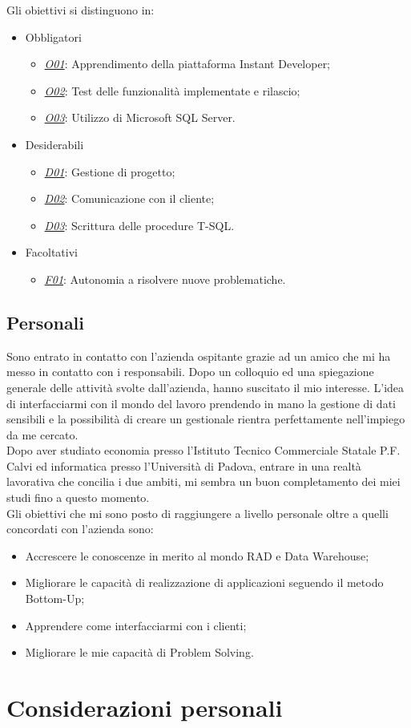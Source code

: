 Gli obiettivi si distinguono in:
\begin{itemize}
	\item Obbligatori
	\begin{itemize}
		\item \underline{\textit{O01}}: Apprendimento della piattaforma Instant Developer;
		\item \underline{\textit{O02}}: Test delle funzionalità implementate e rilascio;
		\item \underline{\textit{O03}}: Utilizzo di Microsoft SQL Server.
	\end{itemize}
	
	\item Desiderabili 
	\begin{itemize}
		\item \underline{\textit{D01}}: Gestione di progetto;
		\item \underline{\textit{D02}}: Comunicazione con il cliente;
		\item \underline{\textit{D03}}: Scrittura delle procedure T-SQL.
	\end{itemize}
	
	\item Facoltativi
	\begin{itemize}
		\item \underline{\textit{F01}}: Autonomia a risolvere nuove problematiche.
	\end{itemize} 
\end{itemize}

\subsection{Personali}
Sono entrato in contatto con l’azienda ospitante grazie ad un amico che mi ha messo in contatto con i responsabili. Dopo un colloquio ed una spiegazione generale delle attività svolte dall'azienda, hanno suscitato il mio interesse. L'idea di interfacciarmi con il mondo del lavoro prendendo in mano la gestione di dati sensibili e la possibilità di creare un gestionale rientra perfettamente nell'impiego da me cercato.\\
Dopo aver studiato economia presso l'Istituto Tecnico Commerciale Statale P.F. Calvi ed informatica presso l'Università di Padova, entrare in una realtà lavorativa che concilia i due ambiti, mi sembra un buon completamento dei miei studi fino a questo momento.\\
Gli obiettivi che mi sono posto di raggiungere a livello personale oltre a quelli concordati con l'azienda sono: 
\begin{itemize}
	\item Accrescere le conoscenze in merito al mondo RAD e Data Warehouse;
	\item Migliorare le capacità di realizzazione di applicazioni seguendo il metodo Bottom-Up;
	\item Apprendere come interfacciarmi con i clienti;
	\item Migliorare le mie capacità di Problem Solving.
\end{itemize}

\section{Considerazioni personali}
